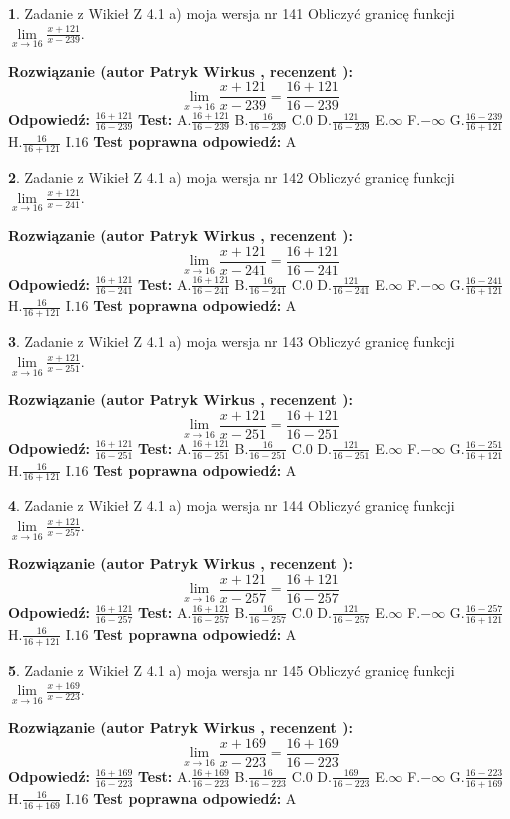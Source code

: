 \documentclass[12pt, a4paper]{article}
\theoremstyle{definition} %
\newtheorem{zad}{}
\newcommand{\zadStart}[1]{\begin{zad}#1\newline}
\newcommand{\zadStop}{\end{zad}}
\newcommand{\rozwStart}[2]{\noindent \textbf{Rozwiązanie (autor #1 , recenzent #2): }\newline}
\newcommand{\rozwStop}{\newline}
\newcommand{\odpStart}{\noindent \textbf{Odpowiedź:}\newline}
\newcommand{\odpStop}{\newline}
\newcommand{\testStart}{\noindent \textbf{Test:}\newline}
\newcommand{\testStop}{\newline}
\newcommand{\kluczStart}{\noindent \textbf{Test poprawna odpowiedź:}\newline}
\newcommand{\kluczStop}{\newline}
\begin{document}
\zadStart{Zadanie z Wikieł Z 4.1 a) moja wersja nr 141}
Obliczyć granicę funkcji $\lim\limits_{x\to16}\frac{x+121}{x-239}$.
\zadStop
\rozwStart{Patryk Wirkus}{}
$$\lim\limits_{x\to16}\frac{x+121}{x-239} = \frac{16+121}{16-239}$$
\rozwStop
\odpStart
$\frac{16+121}{16-239}$
\odpStop
\testStart
A.$\frac{16+121}{16-239}$
B.$\frac{16}{16-239}$
C.$0$
D.$\frac{121}{16-239}$
E.$\infty$
F.$-\infty$
G.$\frac{16-239}{16+121}$
H.$\frac{16}{16+121}$
I.$16$
\testStop
\kluczStart
A
\kluczStop



\zadStart{Zadanie z Wikieł Z 4.1 a) moja wersja nr 142}
Obliczyć granicę funkcji $\lim\limits_{x\to16}\frac{x+121}{x-241}$.
\zadStop
\rozwStart{Patryk Wirkus}{}
$$\lim\limits_{x\to16}\frac{x+121}{x-241} = \frac{16+121}{16-241}$$
\rozwStop
\odpStart
$\frac{16+121}{16-241}$
\odpStop
\testStart
A.$\frac{16+121}{16-241}$
B.$\frac{16}{16-241}$
C.$0$
D.$\frac{121}{16-241}$
E.$\infty$
F.$-\infty$
G.$\frac{16-241}{16+121}$
H.$\frac{16}{16+121}$
I.$16$
\testStop
\kluczStart
A
\kluczStop



\zadStart{Zadanie z Wikieł Z 4.1 a) moja wersja nr 143}
Obliczyć granicę funkcji $\lim\limits_{x\to16}\frac{x+121}{x-251}$.
\zadStop
\rozwStart{Patryk Wirkus}{}
$$\lim\limits_{x\to16}\frac{x+121}{x-251} = \frac{16+121}{16-251}$$
\rozwStop
\odpStart
$\frac{16+121}{16-251}$
\odpStop
\testStart
A.$\frac{16+121}{16-251}$
B.$\frac{16}{16-251}$
C.$0$
D.$\frac{121}{16-251}$
E.$\infty$
F.$-\infty$
G.$\frac{16-251}{16+121}$
H.$\frac{16}{16+121}$
I.$16$
\testStop
\kluczStart
A
\kluczStop



\zadStart{Zadanie z Wikieł Z 4.1 a) moja wersja nr 144}
Obliczyć granicę funkcji $\lim\limits_{x\to16}\frac{x+121}{x-257}$.
\zadStop
\rozwStart{Patryk Wirkus}{}
$$\lim\limits_{x\to16}\frac{x+121}{x-257} = \frac{16+121}{16-257}$$
\rozwStop
\odpStart
$\frac{16+121}{16-257}$
\odpStop
\testStart
A.$\frac{16+121}{16-257}$
B.$\frac{16}{16-257}$
C.$0$
D.$\frac{121}{16-257}$
E.$\infty$
F.$-\infty$
G.$\frac{16-257}{16+121}$
H.$\frac{16}{16+121}$
I.$16$
\testStop
\kluczStart
A
\kluczStop



\zadStart{Zadanie z Wikieł Z 4.1 a) moja wersja nr 145}
Obliczyć granicę funkcji $\lim\limits_{x\to16}\frac{x+169}{x-223}$.
\zadStop
\rozwStart{Patryk Wirkus}{}
$$\lim\limits_{x\to16}\frac{x+169}{x-223} = \frac{16+169}{16-223}$$
\rozwStop
\odpStart
$\frac{16+169}{16-223}$
\odpStop
\testStart
A.$\frac{16+169}{16-223}$
B.$\frac{16}{16-223}$
C.$0$
D.$\frac{169}{16-223}$
E.$\infty$
F.$-\infty$
G.$\frac{16-223}{16+169}$
H.$\frac{16}{16+169}$
I.$16$
\testStop
\kluczStart
A
\kluczStop
\end{document}
